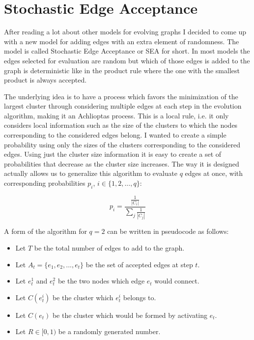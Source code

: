 \section{Stochastic Edge Acceptance}
After reading a lot about other models for evolving graphs I decided to come up with a new model for adding edges with an extra element of randomness.
The model is called Stochastic Edge Acceptance or SEA for short.
In most models the edges selected for evaluation are random but which of those edges is added to the graph is deterministic like in the product rule where the one with the smallest product is always accepted.

The underlying idea is to have a process which favors the minimization of the largest cluster through considering multiple edges at each step in the evolution algorithm, making it an Achlioptas process.
This is a local rule, i.e. it only considers local information such as the size of the clusters to which the nodes corresponding to the considered edges belong.
I wanted to create a simple probability using only the sizes of the clusters corresponding to the considered edges.
Using just the cluster size information it is easy to create a set of probabilities that decrease as the cluster size increases.
The way it is designed actually allows us to generalize this algorithm to evaluate $q$ edges at once, with corresponding probabilities $p_i$, $i \in \{1, 2, ..., q\}$:

\begin{equation}
	p_i = \frac{\frac{1}{|C_i|}}{\sum_j \frac{1}{|C_j|}}
\end{equation}

A form of the algorithm for $q = 2$ can be written in pseudocode as follows:
\begin{itemize}
	\item Let $T$ be the total number of edges to add to the graph.
	\item Let $A_t = \{e_1, e_2, ..., e_t\}$ be the set of accepted edges at step $t$.
	\item Let $e_t^1$ and $e_t^2$ be the two nodes which edge $e_t$ would connect.
	\item Let $C(e_t^i)$ be the cluster which $e_t^i$ belongs to.
	\item Let $C(e_t)$ be the cluster which would be formed by activating $e_t$.
	\item Let $R \in [0, 1)$ be a randomly generated number.
\end{itemize}

